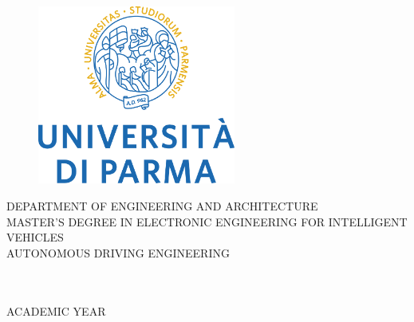 {


\thispagestyle{empty}
\linespread{1.2}\selectfont
\mbox{}
\vspace{-2cm}
\begin{center}
\begin{figure}[h]
\begin{center}
\includegraphics[width=6.5cm]{LateX/figs/UNIPR_CENTRATO_2RIGHE_POS_CMYK.png}
\end{center}
\end{figure}

\setlength{\headwidth}{\textwidth}

\vspace{0.75cm}
\large\textsc{DEPARTMENT OF ENGINEERING AND ARCHITECTURE}\\[5mm]
\large\textsc{MASTER’S DEGREE IN ELECTRONIC ENGINEERING FOR INTELLIGENT VEHICLES}\\
\large\textsc{AUTONOMOUS DRIVING ENGINEERING}\\

\vspace{1.0cm}
\Large\textbf{\MakeUppercase{\thesistitle}}\\
\vspace{1.0cm}


\vspace{0.5cm}
\\
\vspace{1.5cm}
\centering
\large\textsc{ACADEMIC YEAR \acyear}\\
\end{center}

\cleardoublepage
}